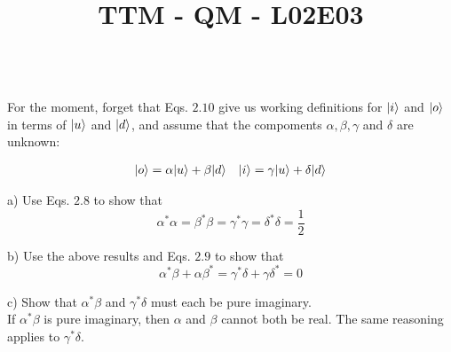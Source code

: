 \documentclass[solutions.tex]{subfiles}
\title{TTM - QM - L02E03}
\begin{document}
\maketitle
\begin{exercise}\ \\
For the moment, forget that Eqs. $2.10$ give us working
definitions for $|i\rangle$ and $|o\rangle$ in terms of $|u\rangle$
and $|d\rangle$, and assume that the compoments $\alpha, \beta, \gamma$
and $\delta$ are unknown:

\begin{align*}
|o\rangle &= \alpha|u\rangle + \beta|d\rangle &
|i\rangle &= \gamma|u\rangle + \delta|d\rangle \\
\end{align*}

a) Use Eqs. $2.8$ to show that
\[
	\alpha^*\alpha = \beta^*\beta = \gamma^*\gamma = \delta^*\delta = \frac1{2}
\]

b) Use the above results and Eqs. $2.9$ to show that
\[
	\alpha^*\beta + \alpha\beta^* = \gamma^*\delta + \gamma\delta^* = 0
\]

c) Show that $\alpha^*\beta$ and $\gamma^*\delta$ must each be pure imaginary. \\

If $\alpha^*\beta$ is pure imaginary, then $\alpha$ and $\beta$ cannot both be
real. The same reasoning applies to $\gamma^*\delta$.

\end{exercise}
\hrr
\end{document}
